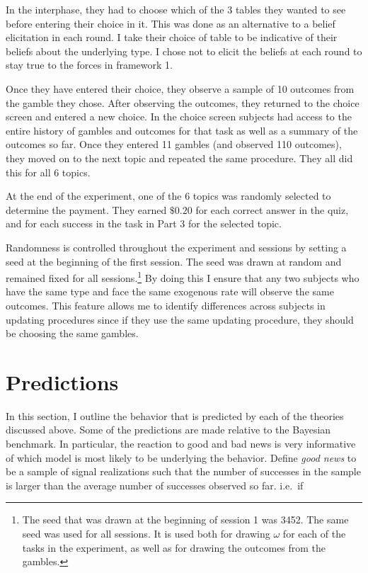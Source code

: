 \documentclass[
  12pt,
]{article}
\begin{document}
In the interphase, they had to choose which of the 3 tables they wanted
to see before entering their choice in it. This was done as an
alternative to a belief elicitation in each round. I take their choice
of table to be indicative of their beliefs about the underlying type. I
chose not to elicit the beliefs at each round to stay true to the forces
in framework 1.

Once they have entered their choice, they observe a sample of 10
outcomes from the gamble they chose. After observing the outcomes, they
returned to the choice screen and entered a new choice. In the choice
screen subjects had access to the entire history of gambles and outcomes
for that task as well as a summary of the outcomes so far. Once they
entered 11 gambles (and observed 110 outcomes), they moved on to the
next topic and repeated the same procedure. They all did this for all 6
topics.

At the end of the experiment, one of the 6 topics was randomly selected
to determine the payment. They earned \(\$0.20\) for each correct answer
in the quiz, and for each success in the task in Part 3 for the selected
topic.

Randomness is controlled throughout the experiment and sessions by
setting a seed at the beginning of the first session. The seed was drawn
at random and remained fixed for all
sessions.\footnote{The seed that was drawn 
at the beginning of session 1 was 3452. The same seed was used for all sessions. It is used both for drawing $\omega$ for each of 
the tasks in the experiment, as well as for drawing the outcomes from the gambles.}
By doing this I ensure that any two subjects who have the same type and
face the same exogenous rate will observe the same outcomes. This
feature allows me to identify differences across subjects in updating
procedures since if they use the same updating procedure, they should be
choosing the same gambles.

\hypertarget{predictions}{%
\section{Predictions}\label{predictions}}

In this section, I outline the behavior that is predicted by each of the
theories discussed above. Some of the predictions are made relative to
the Bayesian benchmark. In particular, the reaction to good and bad news
is very informative of which model is most likely to be underlying the
behavior. Define \emph{good news} to be a sample of signal realizations
such that the number of successes in the sample is larger than the
average number of successes observed so far. i.e.~if
\end{document}
